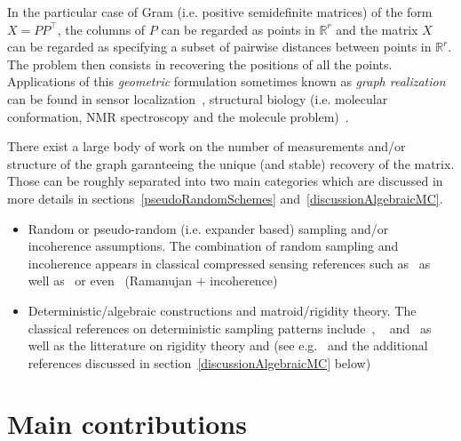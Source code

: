 \documentclass[12pt]{article}
\begin{document}
In the particular case of Gram (i.e. positive semidefinite matrices) of the form $X = PP^\intercal$,  the columns of $P$ can be regarded as points in $\mathbb{R}^r$ and the matrix $X$ can be regarded as specifying a subset of pairwise distances between points in $\mathbb{R}^r$.  The problem then consists in recovering the positions of all the points.  Applications of this \emph{geometric} formulation sometimes known as \emph{graph realization} can be found in sensor localization~\cite{singer2008remark, biswas2006semidefinite},  structural biology (i.e. molecular conformation, NMR spectroscopy and the molecule problem)~\cite{hadani2011representation}.

There exist a large body of work on the number of measurements and/or structure of the graph garanteeing the unique (and stable) recovery of the matrix.  Those can be roughly separated into two main categories which are discussed in more details in sections~\ref{pseudoRandomSchemes} and~\ref{discussionAlgebraicMC}. 
\begin{itemize}
\item Random or pseudo-random (i.e. expander based) sampling and/or incoherence assumptions.  The combination of random sampling and incoherence appears in classical compressed sensing references such as~\cite{candes2010power, candes2008exact, recht2011simpler} as well as~\cite{keshavan2009matrix, keshavan2010matrix} or even~\cite{bhojanapalli2014universal, burnwal2020deterministic, burnwal2019construction, butnwal2019some, burnwal2020exact} (Ramanujan + incoherence) 
\item Deterministic/algebraic constructions and matroid/rigidity theory.  The classical references on deterministic sampling patterns include~\cite{kiraly2015algebraic}, ~\cite{singer2010uniqueness} and~\cite{pimentel2016characterization} as well as the litterature on rigidity theory and (see e.g.~\cite{cucuringu2012graph} and the additional references discussed in section~\ref{discussionAlgebraicMC} below)
\end{itemize}

\section{Main contributions}
\end{document}
